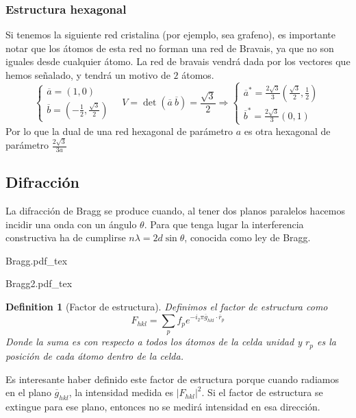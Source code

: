 \documentclass[leqno]{article}
\newtheorem*{definition}{Definition}
\newcommand{\incfig}[1]{%
\center
\def\svgwidth{0.9\columnwidth}
{#1.pdf_tex}
}
\begin{document}
\subsubsection{Estructura hexagonal}
Si tenemos la siguiente red cristalina (por ejemplo, sea grafeno), es importante notar que los átomos de esta red no forman una red de Bravais, ya que no son iguales desde cualquier átomo. La red de bravais vendrá dada por los vectores que hemos señalado, y tendrá un motivo de $2$ átomos.
\[
\begin{cases}
  \overline{a} = (1, 0)\\
  \overline{b} = (-\frac{1}{2}, \frac{\sqrt{3} }{2})
\end{cases} \quad V = \det(\overline{a}\ \overline{b}) = \frac{\sqrt{3} }{2} \Rightarrow 
\begin{cases}
  \overline{a}^* = \frac{2 \sqrt{3} }{3}(\frac{\sqrt{3} }{2}, \frac{1}{2}) \\
  \overline{b}^* = \frac{2 \sqrt{3} }{3}( 0, 1)
\end{cases}
\] 
Por lo que la dual de una red hexagonal de parámetro $a$ es otra hexagonal de parámetro $\frac{2 \sqrt{3}}{3a}$

\subsection{Difracción}
La difracción de Bragg se produce cuando, al tener dos planos paralelos hacemos incidir una onda con un ángulo $\theta$. Para que tenga lugar la interferencia constructiva ha de cumplirse $n\lambda= 2d \sin\theta $, conocida como ley de Bragg.

\begin{minipage}{0.4\textwidth}
  \incfig{Bragg}
\end{minipage}
\begin{minipage}{0.6\textwidth}
  \incfig{Bragg2}
\end{minipage}

\begin{definition}[Factor de estructura] Definimos el factor de estructura como
  \[
  F_{hkl} = \sum_p f_p e^{-i_2\pi \overline{g}_{hkl}\cdot \overline{r}_p}
  \] 
  Donde la suma es con respecto a todos los átomos de la celda unidad y $r_p$ es la posición de cada átomo dentro de la celda.
\end{definition}

Es interesante haber definido este factor de estructura porque cuando radiamos en el plano $\overline{g}_{hkl}$, la intensidad medida es $|F_{hkl}|^2$. Si el factor de estructura se extingue para ese plano, entonces no se medirá intensidad en esa dirección.
\end{document}
